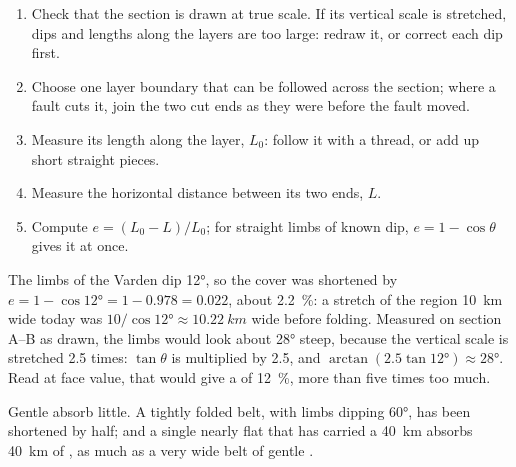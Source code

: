 \begin{method}\label{met:g12:mountain-building:shortening}
\begin{enumerate}
  \item Check that the section is drawn at true scale. If its vertical scale
        is stretched, dips and lengths along the layers are too large: redraw
        it, or correct each dip first.
  \item Choose one layer boundary that can be followed across the section;
        where a fault cuts it, join the two cut ends as they were before the
        fault moved.
  \item Measure its length along the layer, $L_0$: follow it with a thread,
        or add up short straight pieces.
  \item Measure the horizontal distance between its two ends, $L$.
  \item Compute $e = (L_0 - L)/L_0$; for straight limbs of known dip,
        $e = 1 - \cos\theta$ gives it at once.
\end{enumerate}
\end{method}

\begin{example}\label{ex:g12:mountain-building:varden}
The limbs of the Varden  dip \ang{12}, so the cover was shortened by
$e = 1 - \cos\ang{12} = 1 - 0.978 = 0.022$, about \qty{2.2}{\percent}: a
stretch of the region \qty{10}{km} wide today was $10/\cos\ang{12} \approx
\qty{10.22}{km}$ wide before folding. Measured on section A--B as drawn, the
limbs would look about \ang{28} steep, because the vertical scale is
stretched 2.5 times: $\tan\theta$ is multiplied by 2.5, and $\arctan(2.5
\tan\ang{12}) \approx \ang{28}$. Read at face value, that would give a
 of \qty{12}{\percent}, more than five times too much.
\end{example}

Gentle  absorb little. A tightly folded belt, with limbs dipping
\ang{60}, has been shortened by half; and a single nearly flat  that
has carried a  \qty{40}{km} absorbs \qty{40}{km} of , as much
as a very wide belt of gentle .

